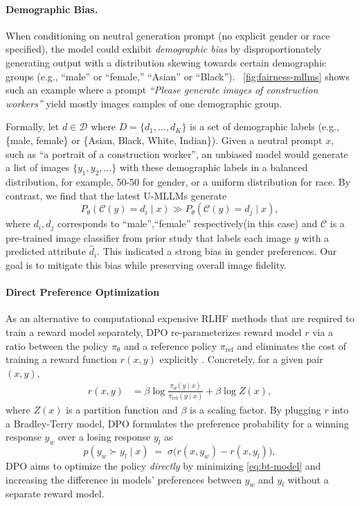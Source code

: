 \paragraph{Demographic Bias.}  
When conditioning on neutral generation prompt (no explicit gender or race specified), the model could exhibit \emph{demographic bias} by disproportionately generating output with a distribution skewing towards certain demographic groups (e.g., “male” or “female,” “Asian” or “Black”). ~\autoref{fig:fairness-mllms} shows such an example where a prompt \emph{``Please generate images of construction workers''} yield mostly images samples of one demographic group.

Formally, let $d \in \mathcal{D}$ where $D = \{d_1, \ldots, d_K\}$ is a set of demographic labels (e.g., \{male, female\} or \{Asian, Black, White, Indian\}). Given a neutral prompt \( x \), such as ``a portrait of a construction worker'', an unbiased model would generate a list of images \( \{y_1, y_2, \ldots\} \) with these demographic labels in a balanced distribution, for example, 50-50 for gender, or a uniform distribution for race. By contrast, we find that the latest U-MLLMs generate
\[
P_\theta(\mathcal{C}(y) = d_i \mid x) \gg P_\theta(\mathcal{C}(y) = d_j \mid x),
\]
where $d_i, d_j$ corresponds to ``male'',``female'' respectively(in this case) and $\mathcal{C}$ is a pre-trained image classifier from prior study \cite{shen2024finetuningtexttoimagediffusionmodels} that labels each image $y$ with a predicted attribute $\hat{d}_i$. This indicated a strong bias in gender preferences. Our goal is to mitigate this bias while preserving overall image fidelity.
\vspace{-1em}
\paragraph{Direct Preference Optimization} As an alternative to computational expensive RLHF \cite{ouyang2022traininglanguagemodelsfollow} methods that are required to train a reward model separately, DPO re-parameterizes reward model $r$ via a ratio between the policy $\pi_\theta$ and a reference policy $\pi_{\text{ref}}$ and eliminates the cost of training a reward function $r(x,y)$ explicitly \cite{rafailov2024direct}. Concretely, for a given pair $(x,y)$,
\begin{align}
r(x,y) 
&= \beta \log \frac{\pi_\theta(y \mid x)}{\pi_{\text{ref}}(y \mid x)} 
+ \beta \log Z(x),
\label{eq:dpo_reward_restate}
\end{align}
where $Z(x)$ is a partition function and $\beta$ is a scaling factor\cite{rafailov2024direct}. By plugging $r$ into a Bradley-Terry model\cite{Bradley1952RankAO}, DPO formulates the preference probability for a winning response $y_w$ over a losing response $y_l$ as
\begin{equation}
p(y_w \succ y_l \mid x) 
\;=\;
\sigma \bigl( r(x,y_w) - r(x,y_l)\bigr),
\label{eq:bt-model}
\end{equation}
DPO aims to optimize the policy \emph{directly} by minimizing \autoref{eq:bt-model} and increasing the difference in models' preferences between $y_w$ and $y_l$ without a separate reward model.

